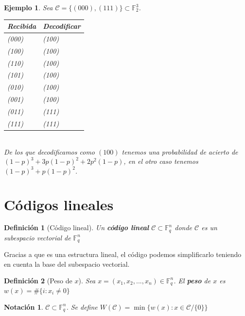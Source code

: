\documentclass[spanish]{book}
\newtheorem{mydef}{Definición}
\newtheorem{nota}{Notación}
\newtheorem{ejem}{Ejemplo}
\begin{document}
\begin{ejem}
	Sea $\mathcal{C}=\{(000), (111)\} \subset \mathbb{F}_2^3$. \\
	\begin{table}[h]
		\begin{center}
			\begin{tabular}{|l|l|}
				\hline
				Recibida & Decodificar \\
				\hline \hline
				(000) & (100)\\
				\hline 
				(100) & (100)\\
				\hline 
				(110) & (100)\\
				\hline 
				(101) & (100) \\
				\hline 
				(010) & (100)\\
				\hline
				(001) & (100)\\
				\hline 
				(011) & (111) \\
				\hline
				(111) & (111)
				\\
				\hline
				
			\end{tabular}
		\end{center}
	\end{table}
	\\
	De los que decodificamos como $(100)$ tenemos una probabilidad de acierto de $(1-p)^3+3p(1-p)^2+2p^2(1-p)$, en el otro caso tenemos $(1-p)^3+p(1-p)^2$.
\end{ejem}

\section{Códigos lineales}

\begin{mydef}[Código lineal]
	Un \textbf{código lineal} $\mathcal{C} \subset \mathbb{F}_q^n$ donde $\mathcal{C}$ es un subespacio vectorial de $\mathbb{F}_q^n$
\end{mydef}

Gracias a que es una estructura lineal, el código podemos simplificarlo teniendo en cuenta la base del subespacio vectorial.

\begin{mydef}[Peso de $x$]
	Sea $x=(x_1, x_2, ..., x_n) \in \mathbb{F}_q^n$. El \textbf{peso} de $x$ es $w(x)=\#\{i : x_i \neq 0\}$
\end{mydef}

\begin{nota}
	$\mathcal{C} \subset \mathbb{F}_q^n$. Se define $W(\mathcal{C})=\min \{w(x) : x \in \mathcal{C} / \{0\}\}$
\end{nota}
\end{document}
